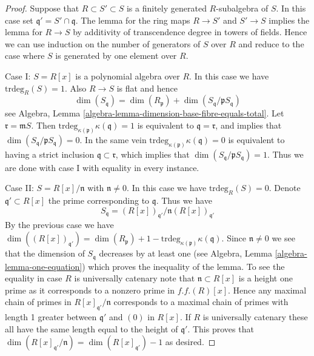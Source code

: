 \begin{proof}
Suppose that $R \subset S' \subset S$ is a finitely generated $R$-subalgebra
of $S$. In this case set $\mathfrak q' = S' \cap \mathfrak q$.
The lemma for the ring maps $R \to S'$ and $S' \to S$ implies the
lemma for $R \to S$ by additivity of transcendence degree in towers
of fields. Hence we can use induction on the number of generators
of $S$ over $R$ and reduce to the case where $S$ is generated by
one element over $R$.

\medskip\noindent
Case I: $S = R[x]$ is a polynomial algebra over $R$.
In this case we have $\text{trdeg}_{R}(S) = 1$.
Also $R \to S$ is flat and hence
$$
\dim(S_{\mathfrak q}) =
\dim(R_{\mathfrak p}) + \dim(S_{\mathfrak q}/\mathfrak pS_{\mathfrak q})
$$
see Algebra, Lemma \ref{algebra-lemma-dimension-base-fibre-equals-total}.
Let $\mathfrak r = \mathfrak mS$. Then
$\text{trdeg}_{\kappa(\mathfrak p)} \kappa(\mathfrak q) = 1$
is equivalent to $\mathfrak q = \mathfrak r$, and implies that
$\dim(S_{\mathfrak q}/\mathfrak pS_{\mathfrak q}) = 0$.
In the same vein $\text{trdeg}_{\kappa(\mathfrak p)} \kappa(\mathfrak q) = 0$
is equivalent to having a strict inclusion
$\mathfrak q \subset \mathfrak r$, which implies that
$\dim(S_{\mathfrak q}/\mathfrak pS_{\mathfrak q}) = 1$.
Thus we are done with case I with equality in every instance.

\medskip\noindent
Case II: $S = R[x]/\mathfrak n$ with $\mathfrak n \not = 0$.
In this case we have $\text{trdeg}_{R}(S) = 0$.
Denote $\mathfrak q' \subset R[x]$ the prime corresponding to $\mathfrak q$.
Thus we have
$$
S_{\mathfrak q} = (R[x])_{\mathfrak q'}/\mathfrak n(R[x])_{\mathfrak q'}
$$
By the previous case we have
$\dim((R[x])_{\mathfrak q'}) =
\dim(R_{\mathfrak p}) + 1
- \text{trdeg}_{\kappa(\mathfrak p)} \kappa(\mathfrak q)$.
Since $\mathfrak n \not = 0$ we see that the dimension of
$S_{\mathfrak q}$ decreases by at least one (see
Algebra, Lemma \ref{algebra-lemma-one-equation})
which proves the
inequality of the lemma.
To see the equality in case $R$ is universally catenary note that
$\mathfrak n \subset R[x]$ is a height one prime as it corresponds
to a nonzero prime in $f.f.(R)[x]$. Hence any maximal chain of primes
in $R[x]_{\mathfrak q'}/\mathfrak n$ corresponds to a maximal chain of primes
with length 1 greater between $\mathfrak q'$ and $(0)$ in $R[x]$.
If $R$ is universally catenary these all have the same length equal to
the height of $\mathfrak q'$. This proves that
$\dim(R[x]_{\mathfrak q'}/\mathfrak n) = \dim(R[x]_{\mathfrak q'}) - 1$
as desired.
\end{proof}










